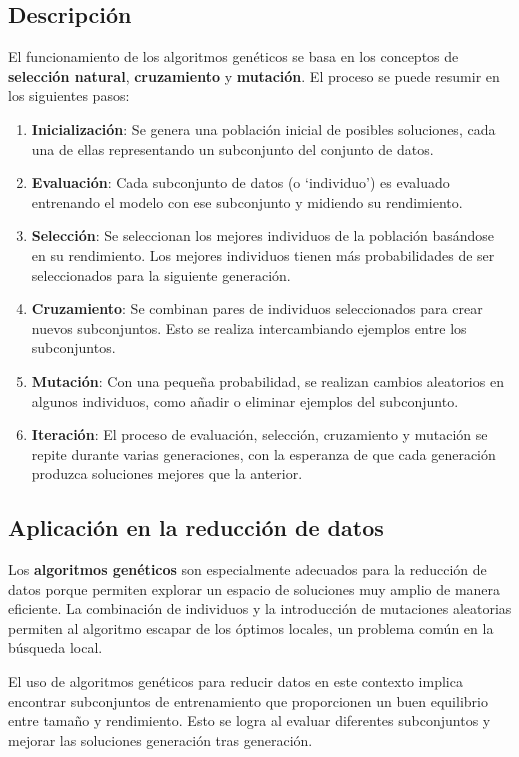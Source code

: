\subsection{Descripción}\label{subsec:descripcion3}
El funcionamiento de los algoritmos genéticos se basa en los conceptos de \textbf{selección natural},
\textbf{cruzamiento} y \textbf{mutación}.
El proceso se puede resumir en los siguientes pasos:
\begin{enumerate}
    \item \textbf{Inicialización}: Se genera una población inicial de posibles soluciones, cada una de ellas
representando un subconjunto del conjunto de datos.
    \item \textbf{Evaluación}: Cada subconjunto de datos (o `individuo') es evaluado entrenando el modelo con ese
subconjunto y midiendo su rendimiento.
    \item \textbf{Selección}: Se seleccionan los mejores individuos de la población basándose en su rendimiento.
Los mejores individuos tienen más probabilidades de ser seleccionados para la siguiente generación.
    \item \textbf{Cruzamiento}: Se combinan pares de individuos seleccionados para crear nuevos subconjuntos.
Esto se realiza intercambiando ejemplos entre los subconjuntos.
    \item \textbf{Mutación}: Con una pequeña probabilidad, se realizan cambios aleatorios en algunos individuos, como
añadir o eliminar ejemplos del subconjunto.
    \item \textbf{Iteración}: El proceso de evaluación, selección, cruzamiento y mutación se repite durante varias
generaciones, con la esperanza de que cada generación produzca soluciones mejores que la anterior.
\end{enumerate}

\subsection{Aplicación en la reducción de datos}\label{subsec:aplicacion-en-la-reduccion-de-datos3}
Los \textbf{algoritmos genéticos} son especialmente adecuados para la reducción de datos porque permiten explorar un
espacio de soluciones muy amplio de manera eficiente.
La combinación de individuos y la introducción de mutaciones aleatorias permiten al algoritmo escapar de los óptimos
locales, un problema común en la búsqueda local.

El uso de algoritmos genéticos para reducir datos en este contexto implica encontrar subconjuntos de entrenamiento que
proporcionen un buen equilibrio entre tamaño y rendimiento.
Esto se logra al evaluar diferentes subconjuntos y mejorar las soluciones generación tras generación.

